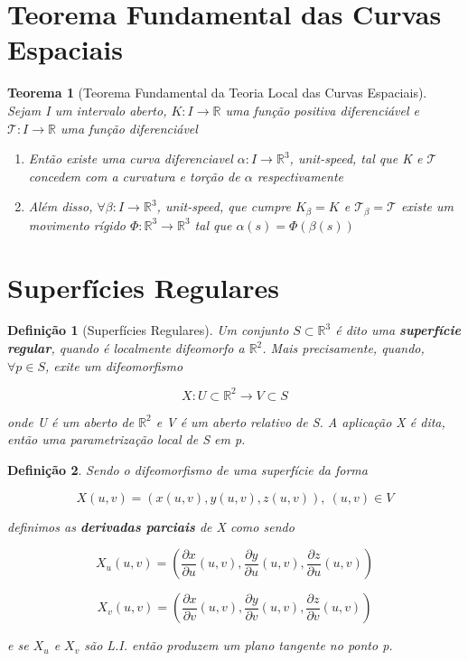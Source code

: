 \documentclass{article}
\newtheorem{theorem}{Teorema}
\newtheorem{definition}{Definição}
\begin{document}
\section*{Teorema Fundamental das Curvas Espaciais}
\label{s6}

\begin{theorem}[Teorema Fundamental da Teoria Local das Curvas Espaciais]
Sejam I um intervalo aberto, $K: I \rightarrow \mathbb{R}$ uma função positiva diferenciável e $\mathcal{T}: I \rightarrow \mathbb{R}$ uma função diferenciável

\begin{enumerate}
    \item Então existe uma curva diferenciavel $\alpha: I \rightarrow \mathbb{R}^3$, unit-speed, tal que K e $\mathcal{T}$ concedem com a curvatura e torção de $\alpha$ respectivamente
    
    \item Além disso, $\forall \beta: I \rightarrow \mathbb{R}^3$, unit-speed, que cumpre $K_\beta = K$ e $\mathcal{T}_\beta = \mathcal{T}$ existe um movimento rígido $\Phi: \mathbb{R}^3 \rightarrow \mathbb{R}^3$ tal que $\alpha(s) = \Phi(\beta(s))$ 
\end{enumerate}
\end{theorem}

\section*{Superfícies Regulares}
\label{s7}

\begin{definition}[Superfícies Regulares]
Um conjunto $S \subset \mathbb{R}^3$ é dito uma \textbf{superfície regular}, quando é localmente difeomorfo a $\mathbb{R}^2$. Mais precisamente, quando, $\forall p \in S$, exite um difeomorfismo

$$X: U \subset \mathbb{R}^2 \rightarrow V \subset S$$

onde U é um aberto de $\mathbb{R}^2$ e V é um aberto relativo de S. A aplicação X é dita, então uma parametrização local de S em p.
\end{definition}

\begin{definition}
Sendo o difeomorfismo de uma superfície da forma

$$X(u, v) = (x(u, v), y(u, v), z(u, v)),\ (u,v) \in V$$

definimos as \textbf{derivadas parciais} de X como sendo

$$X_u(u, v) = \left( \frac{\partial x}{\partial u}(u, v), \frac{\partial y}{\partial u}(u, v), \frac{\partial z}{\partial u}(u, v) \right)$$

$$X_v(u, v) = \left( \frac{\partial x}{\partial v}(u, v), \frac{\partial y}{\partial v}(u, v), \frac{\partial z}{\partial v}(u, v) \right)$$

e se $X_u$ e $X_v$ são L.I. então produzem um plano tangente no ponto p.
\end{definition}
\end{document}
